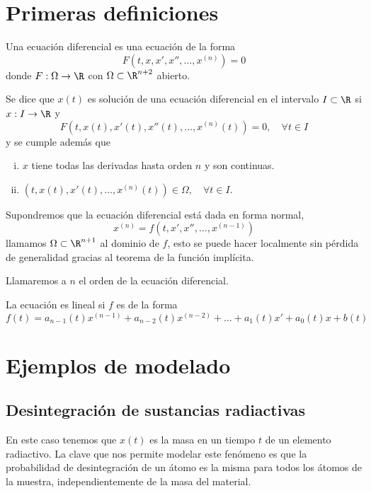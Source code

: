 \documentclass[../main.tex]{subfiles}
\begin{document}
\section{Primeras definiciones}

\begin{definition}
	Una ecuación diferencial es una ecuación de la forma
	\[F(t, x, x', x'', \dots, x^{(n)}) = 0\]
	donde \(F : \Omega \to \R\) con \(\Omega \subset \R^{n + 2}\) abierto.
\end{definition}

Se dice que \(x(t)\) es solución de una ecuación diferencial en el intervalo
\(I \subset \R\) si \(x : I \to \R\) y
\[F(t, x(t), x'(t), x''(t), \dots, x^{(n)}(t)) = 0, \quad \forall t \in I\]
y se cumple además que
\begin{enumerate}[i)]
	\item \(x\) tiene todas las derivadas hasta orden \(n\) y son continuas.
	\item \((t, x(t), x'(t), \dots, x^{(n)}(t)) \in \Omega, \quad \forall t \in I\).
\end{enumerate}

Supondremos que la ecuación diferencial está dada en forma normal,
\[x^{(n)} = f(t, x', x'', \dots, x^{(n - 1)})\]
llamamos \(\Omega \subset \R^{n + 1}\) al dominio de \(f\), esto se puede hacer
localmente sin pérdida de generalidad gracias al teorema de la función
implícita.

\begin{definition}
	Llamaremos a \(n\) el orden de la ecuación diferencial.
\end{definition}

\begin{definition}
	La ecuación es lineal si \(f\) es de la forma
	\[f(t) = a_{n - 1}(t)x^{(n - 1)} + a_{n - 2}(t)x^{(n - 2)} +
		\dots + a_1(t)x' + a_0(t)x + b(t)\]
\end{definition}

\section{Ejemplos de modelado}

\subsection{Desintegración de sustancias radiactivas}

En este caso tenemos que \(x(t)\) es
la masa en un tiempo \(t\) de un elemento radiactivo. La clave que nos permite
modelar este fenómeno es que la probabilidad de desintegración de un átomo es la
misma para todos los átomos de la muestra, independientemente de la masa del
material.
\end{document}
